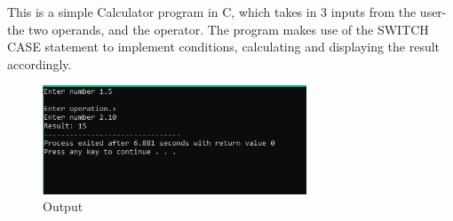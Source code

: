 \documentclass{article}
\begin{document}
\centering

\large This is a simple Calculator program in C, which takes in 3 inputs from the user- the two operands, and the operator. The program makes use of the SWITCH CASE statement to implement conditions, calculating and displaying the result accordingly.

\vspace{1.3cm}

\begin{figure}[h!]
    \centering
    \includegraphics[width=0.7\textwidth]{calculator2.PNG}
    \caption{Output}
\end{figure}
\end{document}
